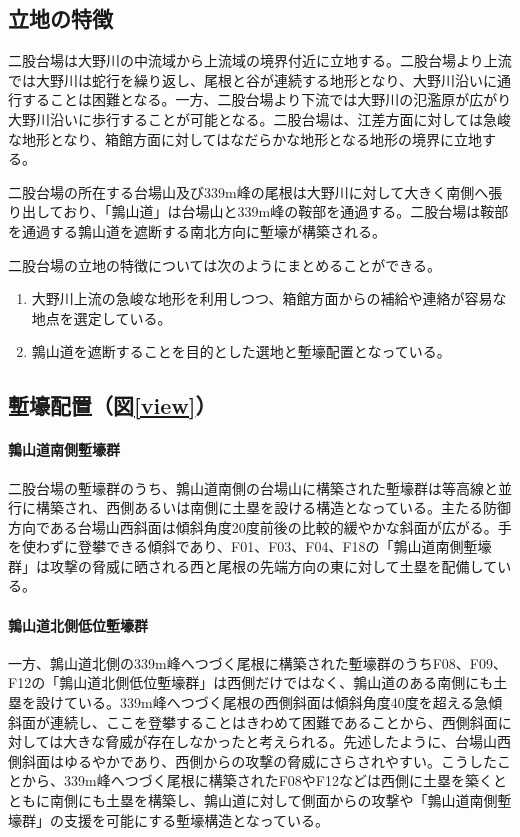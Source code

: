 \documentclass[14Q]{jsarticle}
\begin{document}
\subsection{立地の特徴}
二股台場は大野川の中流域から上流域の境界付近に立地する。二股台場より上流では大野川は蛇行を繰り返し、尾根と谷が連続する地形となり、大野川沿いに通行することは困難となる。一方、二股台場より下流では大野川の氾濫原が広がり大野川沿いに歩行することが可能となる。二股台場は、江差方面に対しては急峻な地形となり、箱館方面に対してはなだらかな地形となる地形の境界に立地する。

二股台場の所在する台場山及び339m峰の尾根は大野川に対して大きく南側へ張り出しており、「鶉山道」は台場山と339m峰の鞍部を通過する。二股台場は鞍部を通過する鶉山道を遮断する南北方向に塹壕が構築される。

二股台場の立地の特徴については次のようにまとめることができる。

\begin{enumerate}
\item 大野川上流の急峻な地形を利用しつつ、箱館方面からの補給や連絡が容易な地点を選定している。
\item 鶉山道を遮断することを目的とした選地と塹壕配置となっている。
\end{enumerate}

\subsection{塹壕配置（図\ref{view}）}
\paragraph{鶉山道南側塹壕群}
二股台場の塹壕群のうち、鶉山道南側の台場山に構築された塹壕群は等高線と並行に構築され、西側あるいは南側に土塁を設ける構造となっている。主たる防御方向である台場山西斜面は傾斜角度20度前後の比較的緩やかな斜面が広がる。手を使わずに登攀できる傾斜であり、F01、F03、F04、F18の「鶉山道南側塹壕群」は攻撃の脅威に晒される西と尾根の先端方向の東に対して土塁を配備している。

\paragraph{鶉山道北側低位塹壕群}
一方、鶉山道北側の339m峰へつづく尾根に構築された塹壕群のうちF08、F09、F12の「鶉山道北側低位塹壕群」は西側だけではなく、鶉山道のある南側にも土塁を設けている。339m峰へつづく尾根の西側斜面は傾斜角度40度を超える急傾斜面が連続し、ここを登攀することはきわめて困難であることから、西側斜面に対しては大きな脅威が存在しなかったと考えられる。先述したように、台場山西側斜面はゆるやかであり、西側からの攻撃の脅威にさらされやすい。こうしたことから、339m峰へつづく尾根に構築されたF08やF12などは西側に土塁を築くとともに南側にも土塁を構築し、鶉山道に対して側面からの攻撃や「鶉山道南側塹壕群」の支援を可能にする塹壕構造となっている。
\end{document}
